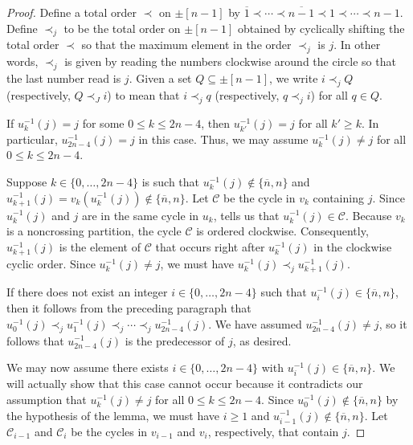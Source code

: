 \documentclass[ALCO,ThmDefs,Unicode,epreuves]{cedram}
\begin{document}
\begin{proof}
Define a total order $\prec$ on $\pm[n-1]$ by $\overline 1\prec\cdots\prec\overline{n-1}\prec 1\prec\cdots\prec n-1$. Define $\prec_j$ to be the total order on $\pm[n-1]$ obtained by cyclically shifting the total order $\prec$ so that the maximum element in the order $\prec_j$ is $j$. In other words, $\prec_j$ is given by reading the numbers clockwise around the circle so that the last number read is $j$. Given a set $Q\subseteq\pm[n-1]$, we write $i\prec_j Q$ (respectively, $Q\prec_J i$) to mean that $i\prec_j q$ (respectively, $q\prec_j i$) for all $q\in Q$. 

If $u_k^{-1}(j)=j$ for some $0\leq k\leq 2n-4$, then $u_{k'}^{-1}(j)=j$ for all $k'\geq k$. In particular, $u_{2n-4}^{-1}(j)=j$ in this case. Thus, we may assume $u_k^{-1}(j)\neq j$ for all $0\leq k\leq 2n-4$.  

Suppose $k\in\{0,\ldots,2n-4\}$ is such that $u_k^{-1}(j)\not\in\{\overline n,n\}$ and $u_{k+1}^{-1}(j)=v_k(u_k^{-1}(j))\not\in\{\overline n,n\}$. Let $\mathcal C$ be the cycle in $v_k$ containing $j$. Since $u_k^{-1}(j)$ and $j$ are in the same cycle in $u_k$,  tells us that $u_k^{-1}(j)\in\mathcal C$. Because $v_k$ is a noncrossing partition, the cycle $\mathcal C$ is ordered clockwise. Consequently, $u_{k+1}^{-1}(j)$ is the element of $\mathcal C$ that occurs right after $u_k^{-1}(j)$ in the clockwise cyclic order. Since $u_k^{-1}(j)\neq j$, we must have $u_k^{-1}(j)\prec_j u_{k+1}^{-1}(j)$.

If there does not exist an integer $i\in\{0,\ldots,2n-4\}$ such that $u_i^{-1}(j)\in\{\overline n,n\}$, then it follows from the preceding paragraph that $u_0^{-1}(j)\prec_j u_1^{-1}(j)\prec_j\cdots\prec_j u_{2n-4}^{-1}(j)$. We have assumed $u_{2n-4}^{-1}(j)\neq j$, so it follows that $u_{2n-4}^{-1}(j)$ is the predecessor of $j$, as desired. 

We may now assume there exists $i\in\{0,\ldots,2n-4\}$ with $u_i^{-1}(j)\in\{\overline n,n\}$. We will actually show that this case cannot occur because it contradicts our assumption that $u_{k}^{-1}(j)\neq j$ for all $0\leq k\leq 2n-4$. Since $u_0^{-1}(j)\not\in\{\overline n,n\}$ by the hypothesis of the lemma, we must have $i\geq 1$ and $u_{i-1}^{-1}(j)\not\in\{\overline n,n\}$. Let $\mathcal C_{i-1}$ and $\mathcal C_i$ be the cycles in $v_{i-1}$ and $v_i$, respectively, that contain $j$. 


\end{proof}
\end{document}
